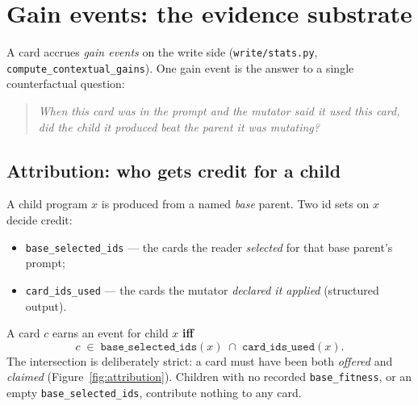 \documentclass[11pt]{article}
\newcommand{\code}[1]{\texttt{\small #1}}
\newcommand{\card}{c}
\begin{document}
\section{Gain events: the evidence substrate}
\label{sec:gain}

A card accrues \emph{gain events} on the write side
(\code{write/stats.py}, \code{compute\_contextual\_gains}). One gain event is the
answer to a single counterfactual question:

\begin{quote}
\emph{When this card was in the prompt and the mutator said it used this card, did
the child it produced beat the parent it was mutating?}
\end{quote}

\subsection{Attribution: who gets credit for a child}

A child program $x$ is produced from a named \emph{base} parent. Two id sets on
$x$ decide credit:
\begin{itemize}[nosep]
  \item \code{base\_selected\_ids} --- the cards the reader \emph{selected} for that
        base parent's prompt;
  \item \code{card\_ids\_used} --- the cards the mutator \emph{declared it applied}
        (structured output).
\end{itemize}
A card $\card$ earns an event for child $x$ \textbf{iff}
\[
  \card \;\in\; \texttt{base\_selected\_ids}(x)\;\cap\;\texttt{card\_ids\_used}(x).
\]
The intersection is deliberately strict: a card must have been both \emph{offered}
and \emph{claimed} (Figure~\ref{fig:attribution}). Children with no recorded
\code{base\_fitness}, or an empty \code{base\_selected\_ids}, contribute nothing to
any card.
\end{document}
